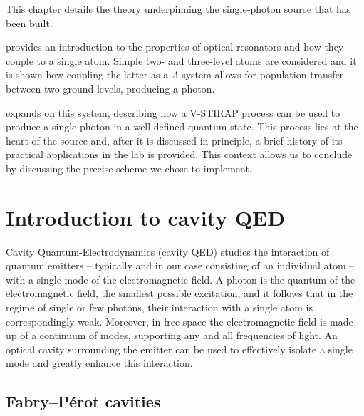 \documentclass[../Thesis-IJspeert.tex]{subfiles}
\begin{document}

\iffalse

This chapter details the theory underpinning the single-photon source that has been built.

 provides an introduction to the properties of optical resonators and how they couple to a single atom.  Simple two- and three-level atoms are considered and it is shown how coupling the latter as a $\Lambda$-system allows for population transfer between two ground levels, producing a photon.

 expands on this system, describing how a V-STIRAP process can be used to produce a single photon in a well defined quantum state.  This process lies at the heart of the source and, after it is discussed in principle, a brief history of its practical applications in the lab is provided.  This context allows us to conclude by discussing the precise scheme we chose to implement.
\pagebreak
\section{Introduction to cavity QED}
\label{sec:IntroductionToCavityQED}

Cavity Quantum-Electrodynamics (cavity QED) studies the interaction of quantum emitters -- typically and in our case consisting of an individual atom -- with a single mode of the electromagnetic field.  A photon is the quantum of the electromagnetic field, the smallest possible excitation, and it follows that in the regime of single or few photons, their interaction with a single atom is correspondingly weak. Moreover, in free space the electromagnetic field is made up of a continuum of modes, supporting any and all frequencies of light.  An optical cavity surrounding the emitter can be used to effectively isolate a single mode and greatly enhance this interaction.
\subsection{Fabry--P\'{e}rot cavities}
\label{sec:FabryPerotCavities}
\end{document}
